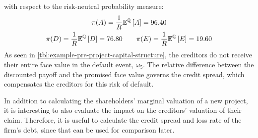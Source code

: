 \documentclass[main.tex]{subfiles}
\begin{document}
    with respect to the risk-neutral probability measure:
        \begin{gather*}
            \pi(A) = \frac{1}{R} \mathbb{E}^{\mathbb{Q}}\left[A\right] = \num{96.40} \\
            \pi(D) = \frac{1}{R} \mathbb{E}^{\mathbb{Q}}\left[D\right] = \num{76.80}
            \qquad \pi(E) = \frac{1}{R} \mathbb{E}^{\mathbb{Q}}\left[E\right] = \num{19.60}
        \end{gather*}
    As seen in \cref{tbl:example-pre-project-capital-structure},
    the creditors do not receive their entire face value in the default event, $\omega_5$.
    The relative difference between the discounted payoff and the promised face value
    governs the credit spread, which compensates the creditors for this risk of default.

    In addition to calculating the shareholders' marginal valuation of a new project,
    it is interesting to also evaluate the impact on the creditors' valuation of their claim. 
    Therefore, it is useful to calculate the credit spread and loss rate of the firm's debt,
    since that can be used for comparison later.
\end{document}

